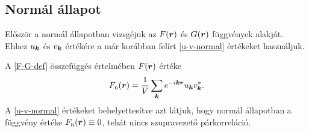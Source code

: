 \documentclass[a4paper,12pt,titlepage]{article}
\newcommand{\KK}{{\vb*{k}}}
\newcommand{\RR}{{\vb*{r}}}
\begin{document}
\subsection{Normál állapot}

Először a normál állapotban vizsgéjuk az $F(\RR)$ és $G(\RR)$ függvények alakját.  Ehhez $u_\KK$ és $v_\KK$ értékére a már korábban felírt \eqref{u-v-normal} értékeket használjuk.

A \eqref{F-G-def} összefüggés értelmében $F(\RR)$ értéke
\begin{equation}
	F_\text{n}(\RR) = \frac{1}{V} \sum\limits_\KK e^{-i \KK \RR} u_\KK v_\KK^*.
\end{equation}
A \eqref{u-v-normal} értékeket behelyettesítve azt látjuk, hogy normál állapotban a függvény értéke $F_\text{n}(\RR) \equiv 0$, tehát nincs szupravezető párkorreláció.
\end{document}

